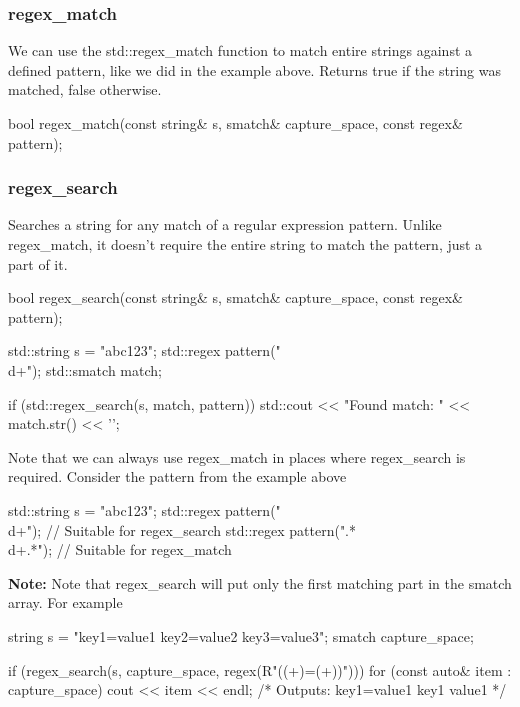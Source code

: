 \documentclass{report}
\begin{document}
    \pagebreak 
    \subsubsection{regex\_match}
    \bigbreak \noindent 
    We can use the std::regex\_match function to match entire strings against a defined pattern, like we did in the example above. Returns true if the string was matched, false otherwise.
    \bigbreak \noindent 
    \begin{cppcode}
        bool regex_match(const string& s, smatch& capture_space, const regex& pattern);
    \end{cppcode}

    \bigbreak \noindent 
    \subsubsection{regex\_search}
    \bigbreak \noindent 
    Searches a string for any match of a regular expression pattern. Unlike regex\_match, it doesn't require the entire string to match the pattern, just a part of it.
    \bigbreak \noindent 
    \begin{cppcode}
        bool regex_search(const string& s, smatch& capture_space, const regex& pattern);
    \end{cppcode}
    \bigbreak \noindent 
    \begin{cppcode}
        std::string s = "abc123";
        std::regex pattern("\\d+");
        std::smatch match;

        if (std::regex_search(s, match, pattern)) {
            std::cout << "Found match: " << match.str() << '\n';
        }
    \end{cppcode}
    \bigbreak \noindent 
    Note that we can always use regex\_match in places where regex\_search is required. Consider the pattern from the example above
    \bigbreak \noindent 
    \begin{cppcode}
        std::string s = "abc123";
        std::regex pattern("\\d+"); // Suitable  for regex_search
        std::regex pattern(".*\\d+.*"); // Suitable  for regex_match
    \end{cppcode}
    \bigbreak \noindent 
    \textbf{Note:} Note that regex\_search will put only the first matching part in the smatch array. For example
    \bigbreak \noindent 
    \begin{cppcode}
        string s = "key1=value1 key2=value2 key3=value3";
        smatch capture_space;

        if (regex_search(s, capture_space, regex(R"(\s*(\w+)=(\w+)\s*)"))) {
            for (const auto& item : capture_space) {
                cout << item << endl;
            }
        }
        /* Outputs: 
            key1=value1 
            key1
            value1
        */
    \end{cppcode}
    
\end{document}
